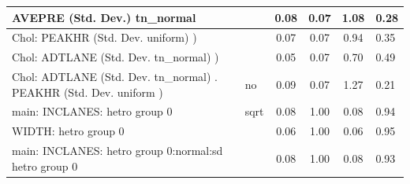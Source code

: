 \begin{table}
\begin{center}
\begin{tabular}{|l|l|c|c|c|l|}
			\hline
			AVEPRE (Std. Dev.) tn_normal &  & 0.08 & 0.07 & 1.08 & 0.28 \\
			\hline
			 Chol: PEAKHR (Std. Dev. uniform) ) &  & 0.07 & 0.07 & 0.94 & 0.35 \\
			\hline
			 Chol: ADTLANE (Std. Dev. tn_normal) ) &  & 0.05 & 0.07 & 0.70 & 0.49 \\
			\hline
			 Chol: ADTLANE (Std. Dev. tn_normal) . PEAKHR (Std. Dev.   uniform ) & no & 0.09 & 0.07 & 1.27 & 0.21 \\
			\hline
			main: INCLANES: hetro group 0 & sqrt & 0.08 & 1.00 & 0.08 & 0.94 \\
			\hline
			WIDTH: hetro group 0 &  & 0.06 & 1.00 & 0.06 & 0.95 \\
			\hline
			main: INCLANES: hetro group 0:normal:sd  hetro group 0 &  & 0.08 & 1.00 & 0.08 & 0.93 \\
			\hline
		\end{tabular}
	\end{center}
\end{table}